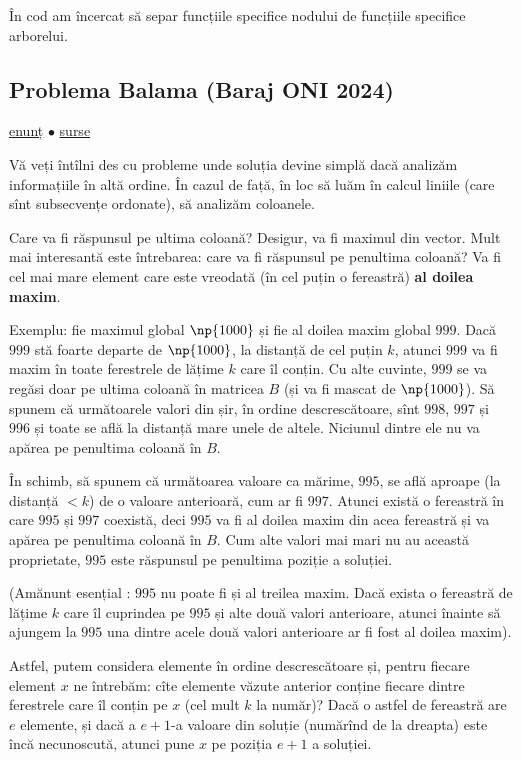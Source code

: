 În cod am încercat să separ funcțiile specifice nodului de funcțiile specifice arborelui.

\subsection{Problema Balama (Baraj ONI 2024)}
\label{problem:balama}

\href{https://kilonova.ro/problems/2666}{enunț}
$\bullet$
\hyperref[code:balama]{surse}

Vă veți întîlni des cu probleme unde soluția devine simplă dacă analizăm informațiile în altă ordine. În cazul de față, în loc să luăm în calcul liniile (care sînt subsecvențe ordonate), să analizăm coloanele.

Care va fi răspunsul pe ultima coloană? Desigur, va fi maximul din vector. Mult mai interesantă este întrebarea: care va fi răspunsul pe penultima coloană? Va fi cel mai mare element care este vreodată (în cel puțin o fereastră) \textbf{al doilea maxim}.

Exemplu: fie maximul global $\np{1000}$ și fie al doilea maxim global $999$. Dacă $999$ stă foarte departe de $\np{1000}$, la distanță de cel puțin $k$, atunci $999$ va fi maxim în toate ferestrele de lățime $k$ care îl conțin. Cu alte cuvinte, $999$ se va regăsi doar pe ultima coloană în matricea $B$ (și va fi mascat de $\np{1000}$). Să spunem că următoarele valori din șir, în ordine descrescătoare, sînt $998$, $997$ și $996$ și toate se află la distanță mare unele de altele. Niciunul dintre ele nu va apărea pe penultima coloană în $B$.

În schimb, să spunem că următoarea valoare ca mărime, $995$, se află aproape (la distanță $< k$) de o valoare anterioară, cum ar fi $997$. Atunci există o fereastră în care $995$ și $997$ coexistă, deci $995$ va fi al doilea maxim din acea fereastră și va apărea pe penultima coloană în $B$. Cum alte valori mai mari nu au această proprietate, $995$ este răspunsul pe penultima poziție a soluției.

(Amănunt esențial : $995$ nu poate fi și al treilea maxim. Dacă exista o fereastră de lățime $k$ care îl cuprindea pe $995$ și alte două valori anterioare, atunci înainte să ajungem la $995$ una dintre acele două valori anterioare ar fi fost al doilea maxim).

Astfel, putem considera elemente în ordine descrescătoare și, pentru fiecare element $x$ ne întrebăm: cîte elemente văzute anterior conține fiecare dintre ferestrele care îl conțin pe $x$ (cel mult $k$ la număr)? Dacă o astfel de fereastră are $e$ elemente, și dacă a $e+1$-a valoare din soluție (numărînd de la dreapta) este încă necunoscută, atunci pune $x$ pe poziția $e+1$ a soluției.

